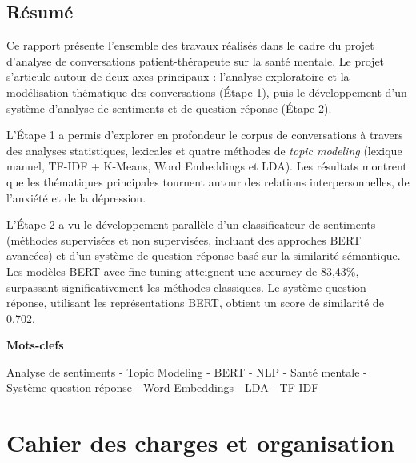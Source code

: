 \documentclass[12pt,a4paper]{report}
\newenvironment{motsclefs}
	{\begin{center}{\bfseries Mots-clefs\vspace{-\topsep}}\end{center}\quotation}
	{\endquotation}
\begin{document}
\chapter*{Résumé}

Ce rapport présente l'ensemble des travaux réalisés dans le cadre du projet d'analyse de conversations patient-thérapeute sur la santé mentale. Le projet s'articule autour de deux axes principaux : l'analyse exploratoire et la modélisation thématique des conversations (Étape 1), puis le développement d'un système d'analyse de sentiments et de question-réponse (Étape 2).

L'Étape 1 a permis d'explorer en profondeur le corpus de conversations à travers des analyses statistiques, lexicales et quatre méthodes de \textit{topic modeling} (lexique manuel, TF-IDF + K-Means, Word Embeddings et LDA). Les résultats montrent que les thématiques principales tournent autour des relations interpersonnelles, de l'anxiété et de la dépression.

L'Étape 2 a vu le développement parallèle d'un classificateur de sentiments (méthodes supervisées et non supervisées, incluant des approches BERT avancées) et d'un système de question-réponse basé sur la similarité sémantique. Les modèles BERT avec fine-tuning atteignent une accuracy de 83,43\%, surpassant significativement les méthodes classiques. Le système question-réponse, utilisant les représentations BERT, obtient un score de similarité de 0,702.

\vspace{1cm}

\begin{motsclefs}
\begin{center}
  Analyse de sentiments - Topic Modeling - BERT - NLP - Santé mentale - Système question-réponse - Word Embeddings - LDA - TF-IDF
\end{center}
\end{motsclefs}

\tableofcontents

\part{Cahier des charges et organisation}
\end{document}

